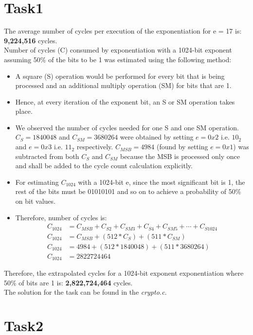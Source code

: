 \documentclass[1p,16pt]{elsarticle}
\begin{document}
\section{Task1}
The average number of cycles per execution of the exponentiation for e = 17 is:
\textbf{9,224,516} cycles.
\\
Number of cycles (C) consumed by exponentiation with a 1024-bit exponent assuming 50\% of the bits to be 1 was estimated using the following method:
\begin{itemize}
	\item A square (S) operation would be performed for every bit that is being processed and an additional multiply operation (SM) for bits that are 1.
	\item Hence, at every iteration of the exponent bit, an S or SM operation takes place.
	\item We observed the number of cycles needed for one S and one SM operation. $C_S = 1840048$ and $C_{SM} = 3680264$
		were obtained by setting $e = 0x2$  i.e. $10_2$ and $e = 0x3$  i.e. $11_2$ respectively.
		$C_{MSB} = 4984$ (found by setting $e = 0x1$) was subtracted from both $C_S$ and $C_{SM}$ because
		the MSB is processed only once and shall be added to the cycle count calculation explicitly.
	\item For estimating $C_{1024}$ with a 1024-bit e, since the most significant bit is 1, the rest of the bits
		must be 01010101 and so on to achieve a probability of 50\% on bit values.
	\item Therefore, number of cycles is: \\
		\begin{align}
			C_{1024} &= C_{MSB} + C_{S2} + C_{SM3} + C_{S4} + C_{SM5} + \cdots + C_{S1024} \\
			C_{1024} &= C_{MSB} + (512 * C_S) + (511 * C_{SM}) \\
			C_{1024} &= 4984 + (512 * 1840048) + (511 * 3680264) \\
			C_{1024} &= 2822724464
		\end{align}
\end{itemize}

Therefore, the extrapolated cycles for a 1024-bit exponent exponentiation where 50\% of bits are 1 is:
\textbf{2,822,724,464} cycles.
\\
The solution for the task can be found in the \textit{crypto.c}.
\section{Task2}
\end{document}

